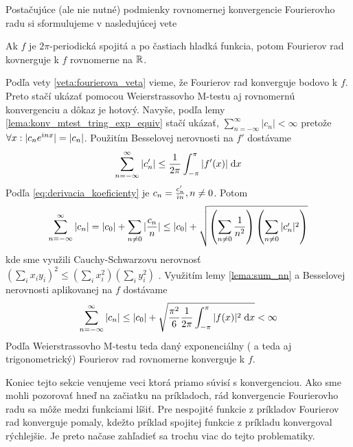 Postačujúce (ale nie nutné) podmienky rovnomernej konvergencie
Fourierovho radu si sformulujeme v nasledujúcej vete
\begin{veta}
 Ak $f$ je $2\pi$-periodická spojitá a po častiach hladká funkcia,
 potom Fourierov rad kovnerguje k $f$ rovnomerne na ${\mathbb R}$.
\end{veta}
\begin{dokaz}
    Podľa vety \ref{veta:fourierova_veta} vieme, že Fourierov rad
    konverguje bodovo k $f$. Preto stačí ukázať pomocou
    Weierstrassovho M-testu aj rovnomernú konvergenciu a dôkaz je
    hotový. Navyše, podľa lemy \ref{lema:konv_mtest_tring_exp_equiv}
    stačí ukázať, $\sum_{n=-\infty}^{\infty} |c_n| < \infty$
    pretože $\forall x: |c_n e^{\hat{\imath} n x}|=|c_n|$.
    Použitím  Besselovej nerovnosti na $f'$ dostávame
    \begin{equation}
        \sum_{n=-\infty}^{\infty} |c_n'| \le \frac{1}{2\pi} \int_{-\pi}^{\pi} |f'(x)| \; \mathrm{d} x
    \end{equation}
    Podľa \eqref{eq:derivacia_koeficienty} je 
    $c_n = \frac{c_n'}{\hat{\imath} n}, n\not=0$. Potom
    \begin{equation}
        \sum_{n=-\infty}^{\infty} |c_n| = |c_0| + \sum_{n\not=0} |\frac{c_n}{n}| \le
         |c_0| + \sqrt{\left( \sum_{n\not=0} \frac{1}{n^2} \right)
                       \left( \sum_{n\not=0} |c_n'|^2 \right)
                       }
    \end{equation}
     kde sme využili Cauchy-Schwarzovu nerovnosť 
     $(\sum_i x_i y_i)^2 \le (\sum_i x_i^2)(\sum_i y_i^2)$
     .
     Využitím lemy \ref{lema:sum_nn} a Besselovej nerovnosti
     aplikovanej na $f$ dostávame
    \begin{equation}
        \sum_{n=-\infty}^{\infty} |c_n| \le 
         |c_0| + \sqrt{\frac{\pi^2}{6} \frac{1}{2\pi} 
                       \int_{-\pi}^{\pi} |f(x)|^2 \; \mathrm{d} x} < \infty
    \end{equation}
    Podľa Weierstrassovho M-testu teda daný exponenciálny ( a teda
    aj trigonometrický) Fourierov  rad rovnomerne konverguje k $f$. 
    \end{dokaz}


Koniec tejto sekcie venujeme veci ktorá priamo súvisí s konvergenciou.
Ako sme mohli pozorovať hneď na začiatku na príkladoch, rád
konvergencie Fourierovho radu sa môže medzi funkciami líšiť. 
Pre nespojité funkcie z príkladov  Fourierov rad 
konverguje pomaly, kdežto príklad spojitej
funkcie z príkladu  konvergoval rýchlejšie.
Je preto načase zahľadieť sa trochu viac do tejto problematiky.

